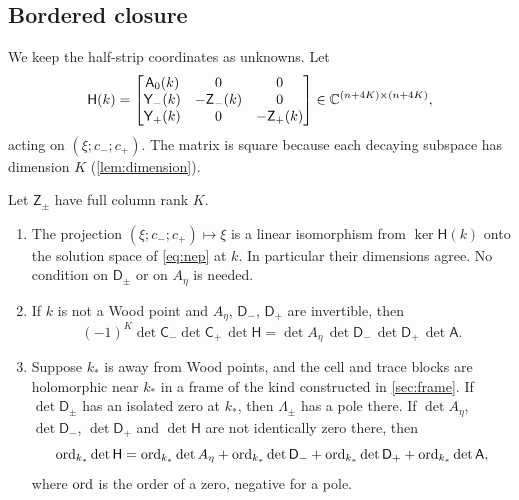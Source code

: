 \subsection{Bordered closure}\label{sec:bordered}
We keep the half-strip coordinates as unknowns. Let
\begin{equation}\label{eq:bordered}
  \mathsf H(k)=
  \begin{bmatrix}
    \mathsf A_0(k)&0&0\\
    \mathsf Y_-(k)&-\mathsf Z_-(k)&0\\
    \mathsf Y_+(k)&0&-\mathsf Z_+(k)
  \end{bmatrix}\in\mathbb{C}^{(n+4K)\times(n+4K)},
\end{equation}
acting on $(\xi;c_-;c_+)$. The matrix is square because each decaying
subspace has dimension $K$ (\cref{lem:dimension}).

\begin{theorem}\label{thm:bordered}
Let $\mathsf Z_\pm$ have full column rank $K$.
\begin{enumerate}
\item The projection $(\xi;c_-;c_+)\mapsto\xi$ is a linear isomorphism from
  $\ker\mathsf H(k)$ onto the solution space of \eqref{eq:nep} at $k$. In
  particular their dimensions agree. No condition on $\mathsf D_\pm$ or on $A_\eta$
  is needed.
\item If $k$ is not a Wood point and $A_\eta$, $\mathsf D_-$, $\mathsf D_+$ are
  invertible, then
  \begin{equation}\label{eq:det-identity}
    (-1)^{K}\det\mathsf C_-\det\mathsf C_+\,\det\mathsf H
    =\det A_\eta\,\det\mathsf D_-\,\det\mathsf D_+\,\det\mathsf A .
  \end{equation}
\item Suppose $k_*$ is away from Wood points, and the cell and trace blocks
  are holomorphic near $k_*$ in a frame of the
  kind constructed in \cref{sec:frame}. If $\det\mathsf D_\pm$ has an isolated zero
  at $k_*$, then $\Lambda_\pm$ has a pole there. If $\det A_\eta$, $\det\mathsf D_-$,
  $\det\mathsf D_+$ and $\det\mathsf H$ are not identically zero there, then
  \begin{equation}\label{eq:order}
    \operatorname{ord}_{k_*}\det\mathsf H=\operatorname{ord}_{k_*}\det A_\eta+\operatorname{ord}_{k_*}\det\mathsf D_-
     +\operatorname{ord}_{k_*}\det\mathsf D_++\operatorname{ord}_{k_*}\det\mathsf A ,
  \end{equation}
  where $\operatorname{ord}$ is the order of a zero, negative for a pole.
\end{enumerate}
\end{theorem}

